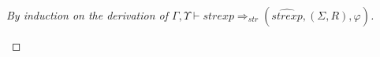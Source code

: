 \begin{proof}[By induction on the derivation of $\Gamma,\Upsilon\vdash
  strexp \Rightarrow_{str} (\widehat{strexp}, (\Sigma,R),\varphi)$]
\begin{description}
\begin{description}










 





 


\end{description}
\end{description}
\end{proof}
